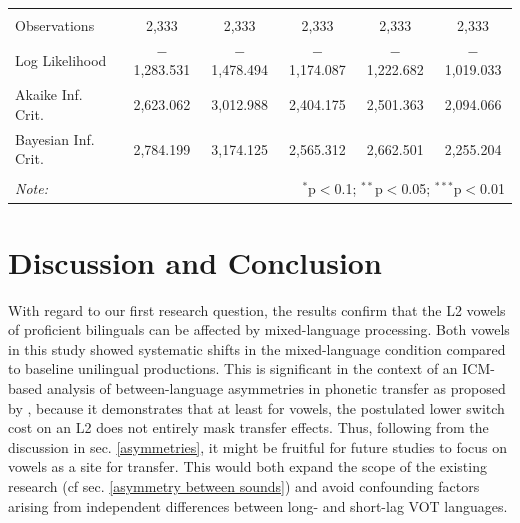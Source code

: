 \documentclass[charis,linguex]{glossa}
\begin{document}
\begin{table}[htbp]
\begin{tabular}{@{\extracolsep{5pt}}lccccc}
		\hline \\[-1.8ex] 
		Observations & 2,333 & 2,333 & 2,333 & 2,333 & 2,333 \\ 
		Log Likelihood & $-$1,283.531 & $-$1,478.494 & $-$1,174.087 & $-$1,222.682 & $-$1,019.033 \\ 
		Akaike Inf. Crit. & 2,623.062 & 3,012.988 & 2,404.175 & 2,501.363 & 2,094.066 \\ 
		Bayesian Inf. Crit. & 2,784.199 & 3,174.125 & 2,565.312 & 2,662.501 & 2,255.204 \\ 
		\hline 
		\hline \\[-1.8ex] 
		\textit{Note:}  & \multicolumn{5}{r}{$^{*}$p$<$0.1; $^{**}$p$<$0.05; $^{***}$p$<$0.01} \\ 
	\end{tabular} 
\end{table} 




\section{Discussion and Conclusion}

With regard to our first research question, the results confirm that the L2 vowels of proficient bilinguals can be affected by mixed-language processing. Both vowels in this study showed systematic shifts in the mixed-language condition compared to baseline unilingual productions. This is significant in the context of an ICM-based analysis of between-language asymmetries in phonetic transfer as proposed by \citep{olson2013bilingual}, because it demonstrates that at least for vowels, the postulated lower switch cost on an L2 does not entirely mask transfer effects. Thus, following from the discussion in sec. \ref{asymmetries}, it might be fruitful for future studies to focus on vowels as a site for transfer. This would both expand the scope of the existing research (cf sec. \ref{asymmetry between sounds}) and avoid confounding factors arising from independent differences between long- and short-lag VOT languages.
\end{document}
